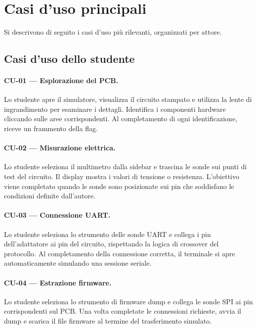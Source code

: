 \section{Casi d'uso principali}
\label{sec:casi-uso}

Si descrivono di seguito i casi d'uso più rilevanti, organizzati per attore.

\subsection{Casi d'uso dello studente}
\label{subsec:cu-studente}

\paragraph{CU-01 --- Esplorazione del PCB.} Lo studente apre il simulatore, visualizza il circuito stampato e utilizza la lente di ingrandimento per esaminare i dettagli. Identifica i componenti hardware cliccando sulle aree corrispondenti. Al completamento di ogni identificazione, riceve un frammento della flag.

\paragraph{CU-02 --- Misurazione elettrica.} Lo studente seleziona il multimetro dalla sidebar e trascina le sonde sui punti di test del circuito. Il display mostra i valori di tensione o resistenza. L'obiettivo viene completato quando le sonde sono posizionate sui pin che soddisfano le condizioni definite dall'autore.

\paragraph{CU-03 --- Connessione UART.} Lo studente seleziona lo strumento delle sonde UART e collega i pin dell'adattatore ai pin del circuito, rispettando la logica di crossover del protocollo. Al completamento della connessione corretta, il terminale si apre automaticamente simulando una sessione seriale.

\paragraph{CU-04 --- Estrazione firmware.} Lo studente seleziona lo strumento di firmware dump e collega le sonde SPI ai pin corrispondenti sul PCB. Una volta completate le connessioni richieste, avvia il dump e scarica il file firmware al termine del trasferimento simulato.

